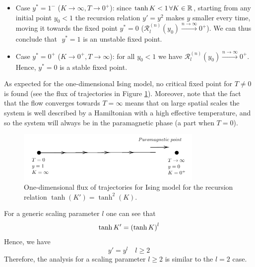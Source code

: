 \documentclass[../main/main.tex]{subfiles}
\begin{document}
\begin{itemize}
\item Case \( y^*=1^- \) (\( K \rightarrow \infty , T \rightarrow 0^+ \)): since \( \tanh K < 1 \, \forall K \in \mathbb{R} \), starting from any initial point \( y_0 <1 \) the recursion relation \( y' = y^2 \) makes \( y \) smaller every time,  moving it towards the fixed point \( y^* = 0 \) (\( \mathcal{R}_l^{(n)} (y_0) \overset{n \rightarrow \infty }{\rightarrow } 0^+ \)). We can thus conclude that \(  \)  \( y^* =1 \) is an unstable fixed point.

\item Case \( y^*=0^+ \) (\( K \rightarrow 0^+ , T \rightarrow \infty  \)): for all \( y_0 <1 \) we have \( \mathcal{R}_l^{(n)} (y_0) \overset{n \rightarrow \infty }{\rightarrow } 0^+ \). Hence,  \( y^* =0 \) is a stable fixed point.

\end{itemize}

As expected for the one-dimensional Ising model, no critical fixed point for \( T \neq 0\) is found (see the flux of trajectories in Figure \ref{fig:20_5}).
Moreover, note that the fact that the flow converges towards \( T = \infty  \) means that on large spatial scales the system is well described by a Hamiltonian with a high effective temperature, and so the system will always be in the paramagnetic phase (a part when \( T=0 \)).

\begin{figure}[h!]
\centering
\includegraphics[width=0.8\textwidth]{../lessons/20_image/5.pdf}
\caption{\label{fig:20_5} One-dimensional flux of trajectories for Ising model for the recursion relation \( \tanh(K') = \tanh^2 (K) \). }
\end{figure}

\begin{remark}
For a generic scaling parameter \( l \) one can see that
\begin{equation*}
  \tanh K' = \qty( \tanh K )^l
\end{equation*}
Hence, we have
\begin{equation*}
  y' = y^l \quad l \ge 2
\end{equation*}
Therefore, the analysis for a scaling parameter \( l \ge 2 \) is similar to the \( l=2 \) case.
\end{remark}
\end{document}
